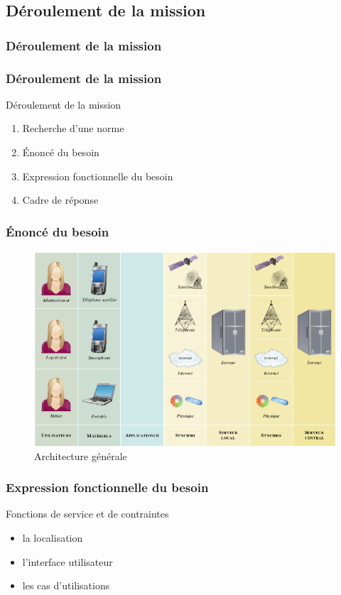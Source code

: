 \subsection{Déroulement de la mission}
\subsubsection{Déroulement de la mission }

\begin{frame}
\frametitle{Déroulement de la mission}
\begin{block}{Déroulement de la mission}
	\begin{enumerate}
	\item Recherche d'une norme
	\item Énoncé du besoin
	\item Expression fonctionnelle du besoin
	\item Cadre de réponse
	\end{enumerate}
	\end{block}
\end{frame}
  
\begin{frame}

\end{frame}  
  
\begin{frame}
\frametitle{Énoncé du besoin}
	\begin{figure}[htbp]
	\centering
	\includegraphics[scale=0.35]{Images/architecture.png}
	\caption{Architecture générale}
\end{figure}
\end{frame}

\begin{frame}
\frametitle{Expression fonctionnelle du besoin}
\begin{block}{Fonctions de service et de contraintes}
\begin{itemize}
\item la localisation
\item l'interface utilisateur
\item les cas d'utilisations
\end{itemize}
\end{block}
\end{frame}

